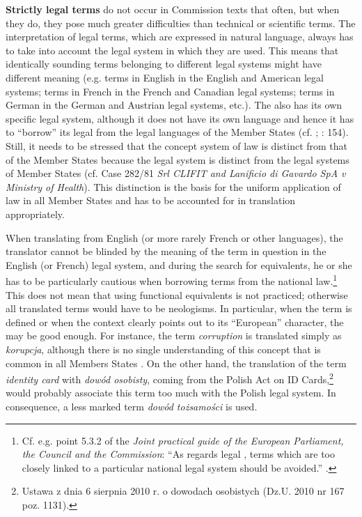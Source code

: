 \documentclass[output=paper]{langsci/langscibook}
\begin{document}
\textbf{Strictly legal terms} do not occur in Commission texts that often, but when they do, they pose much greater difficulties than technical or scientific terms. The interpretation of legal terms, which are expressed in natural language, always has to take into account the legal system in which they are used. This means that identically sounding terms belonging to different legal systems might have different meaning (e.g. terms in English in the English and American legal systems; terms in French in the French and Canadian legal systems; terms in German in the German and Austrian legal systems, etc.). The  also has its own specific legal system, although it does not have its own language and hence it has to “borrow” its legal  from the legal languages of the Member States (cf. \citealt[79, 80]{Kjær2007}; \citealt{Robertson2010}: 154). Still, it needs to be stressed that the concept system of  law is distinct from that of the Member States because the  legal system is distinct from the legal systems of  Member States (cf. Case 282/81 \textit{Srl CLIFIT and Lanificio di Gavardo SpA v Ministry of Health}). This distinction is the basis for the uniform application of  law in all Member States and has to be accounted for in translation appropriately. 

When translating from English (or more rarely French or other  languages), the translator cannot be blinded by the meaning of the term in question in the English (or French) legal system, and during the search for equivalents, he or she has to be particularly cautious when borrowing terms from the national law.\footnote{Cf. e.g. point 5.3.2 of the \textit{Joint practical guide of the European Parliament, the Council and the Commission}: “As regards legal , terms which are too closely linked to a particular national legal system should be avoided.” \citep[18]{EU2015}.} This does not mean that using functional equivalents is not practiced; otherwise all translated terms would have to be neologisms. In particular, when the term is defined or when the context clearly points out to its “European” character, the  may be good enough. For instance, the term \textit{corruption} is translated simply as \textit{korupcja}, although there is no single understanding of this concept that is common in all Members States \citep{Szulik2012}. On the other hand, the translation of the term \textit{identity card} with \textit{dowód osobisty}, coming from the Polish Act on ID Cards,\footnote{Ustawa z dnia 6 sierpnia 2010 r. o dowodach osobistych (Dz.U. 2010 nr 167 poz. 1131).} would probably associate this term too much with the Polish legal system. In consequence, a less marked term \textit{dowód tożsamości} is used.
\end{document}
